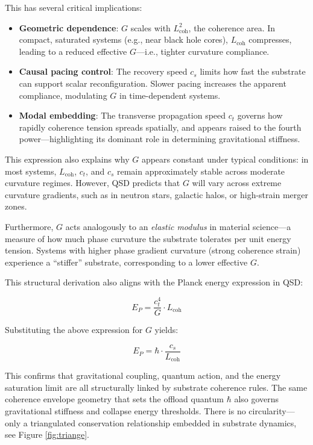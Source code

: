 \documentclass[entropy,article,submit,pdftex,moreauthors]{Definitions/mdpi}
\begin{document}
\medskip
This has several critical implications:

\begin{itemize}
  \item \textbf{Geometric dependence}: $G$ scales with $L_{\text{coh}}^2$, the coherence area. In compact, saturated systems (e.g., near black hole cores), $L_{\text{coh}}$ compresses, leading to a reduced effective $G$—i.e., tighter curvature compliance.
  \item \textbf{Causal pacing control}: The recovery speed $c_s$ limits how fast the substrate can support scalar reconfiguration. Slower pacing increases the apparent compliance, modulating $G$ in time-dependent systems.
  \item \textbf{Modal embedding}: The transverse propagation speed $c_t$ governs how rapidly coherence tension spreads spatially, and appears raised to the fourth power—highlighting its dominant role in determining gravitational stiffness.
\end{itemize}

This expression also explains why $G$ appears constant under typical conditions: in most systems, $L_{\text{coh}}$, $c_t$, and $c_s$ remain approximately stable across moderate curvature regimes. However, QSD predicts that $G$ will vary across extreme curvature gradients, such as in neutron stars, galactic halos, or high-strain merger zones.

Furthermore, $G$ acts analogously to an \textit{elastic modulus} in material science—a measure of how much phase curvature the substrate tolerates per unit energy tension. Systems with higher phase gradient curvature (strong coherence strain) experience a “stiffer” substrate, corresponding to a lower effective $G$.

This structural derivation also aligns with the Planck energy expression in QSD:

\begin{equation}
E_P = \frac{c_t^4}{G} \cdot L_{\text{coh}}
\end{equation}

Substituting the above expression for $G$ yields:

\begin{equation}
E_P = \hbar \cdot \frac{c_s}{L_{\text{coh}}}
\end{equation}

This confirms that gravitational coupling, quantum action, and the energy saturation limit are all structurally linked by substrate coherence rules. The same coherence envelope geometry that sets the offload quantum $\hbar$ also governs gravitational stiffness and collapse energy thresholds. There is no circularity—only a triangulated conservation relationship embedded in substrate dynamics, see Figure \ref{fig:triange}.
\end{document}
